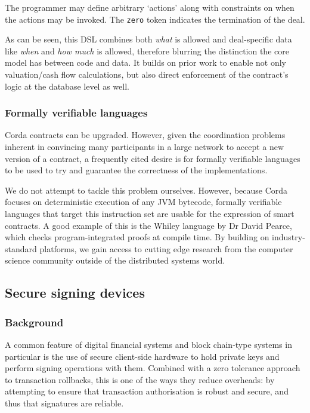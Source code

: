 \documentclass{article}
\begin{document}
The programmer may define arbitrary `actions' along with constraints on when the actions may be invoked. The
\texttt{zero} token indicates the termination of the deal.

As can be seen, this DSL combines both \emph{what} is allowed and deal-specific data like \emph{when} and \emph{how
much} is allowed, therefore blurring the distinction the core model has between code and data. It builds on prior
work to enable not only valuation/cash flow calculations, but also direct enforcement of the contract's logic at
the database level as well.

\subsubsection{Formally verifiable languages}

Corda contracts can be upgraded. However, given the coordination problems inherent in convincing many participants
in a large network to accept a new version of a contract, a frequently cited desire is for formally verifiable
languages to be used to try and guarantee the correctness of the implementations.

We do not attempt to tackle this problem ourselves. However, because Corda focuses on deterministic execution of
any JVM bytecode, formally verifiable languages that target this instruction set are usable for the expression
of smart contracts. A good example of this is the Whiley language by Dr David Pearce\cite{Pearce2015191}, which
checks program-integrated proofs at compile time. By building on industry-standard platforms, we gain access to
cutting edge research from the computer science community outside of the distributed systems world.

\subsection{Secure signing devices}\label{sec:secure-signing-devices}

\subsubsection{Background}

A common feature of digital financial systems and block chain-type systems in particular is the use of secure
client-side hardware to hold private keys and perform signing operations with them. Combined with a zero tolerance
approach to transaction rollbacks, this is one of the ways they reduce overheads: by attempting to ensure that
transaction authorisation is robust and secure, and thus that signatures are reliable.
\end{document}
